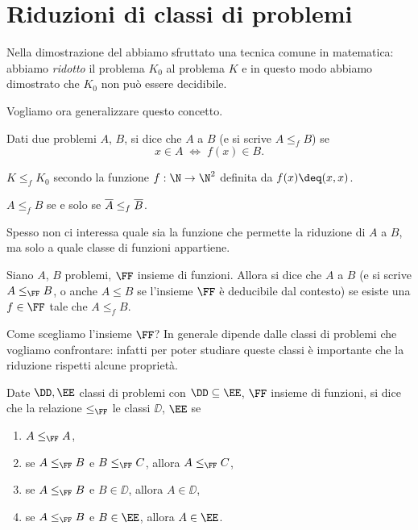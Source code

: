 \section{Riduzioni di classi di problemi}

Nella dimostrazione del  abbiamo sfruttato una tecnica comune in matematica: abbiamo \emph{ridotto} il problema $K_0$ al problema $K$ e in questo modo abbiamo dimostrato che $K_0$ non può essere decidibile.

Vogliamo ora generalizzare questo concetto.

\begin{definition}
    Dati due problemi $A$, $B$, si dice che $A$  a $B$ (e si scrive $A \leq_f B$) se \[
        x \in A \;\iff\; f(x) \in B.
    \] 
\end{definition}

\begin{remark}
    $K \leq_f K_0$ secondo la funzione $f : \N \to \N^2$ definita da $f(x) \deq (x, x)$.   
\end{remark}

\begin{remark}
    $A \leq_f B$ se e solo se $\overline{A} \leq_f \overline{B}$.  
\end{remark}

Spesso non ci interessa quale sia la funzione che permette la riduzione di $A$ a $B$, ma solo a quale classe di funzioni appartiene.

\begin{definition}
    Siano $A$, $B$ problemi, $\FF$ insieme di funzioni. Allora si dice che $A$  a $B$ (e si scrive $A \leq_{\FF} B$, o anche $A \leq B$ se l'insieme $\FF$ è deducibile dal contesto) se esiste una $f \in \FF$ tale che $A \leq_f B$.   
\end{definition}

Come scegliamo l'insieme $\FF$? In generale dipende dalle classi di problemi che vogliamo confrontare: infatti per poter studiare queste classi è importante che la riduzione rispetti alcune proprietà.

\begin{definition}
    Date $\DD, \EE$ classi di problemi con $\DD \subseteq \EE$, $\FF$ insieme di funzioni, si dice che la relazione $\leq_{\FF}$  le classi $\DD$, $\EE$ se \begin{enumerate}
        \item $A \leq_{\FF} A$,
        \item se $A \leq_{\FF} B$ e $B \leq_{\FF} C$, allora $A \leq_{\FF} C$,
        \item se $A \leq_{\FF} B$ e $B \in \DD$, allora $A \in \DD$,
        \item se $A \leq_{\FF} B$ e $B \in \EE$, allora $A \in \EE$.       
    \end{enumerate}   
\end{definition}

